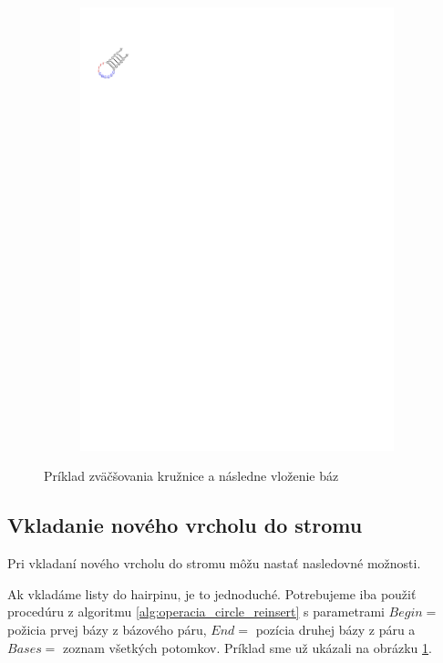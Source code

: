 \begin{figure}
\begin{subfigure}{\wi}
    \includegraphics[trim=1cm 24.5cm 17.5cm 2.5cm]{../img/alg/insert/1/circle-big-end}
  \end{subfigure}

  \caption{Príklad zväčšovania kružnice a následne vloženie báz}
  \label{obr:insert_circle_hairpin}
\end{figure}





\subsection{Vkladanie nového vrcholu do stromu}

Pri vkladaní nového vrcholu do stromu môžu nastať nasledovné možnosti.

Ak vkladáme listy do hairpinu, je to jednoduché. Potrebujeme iba použiť
procedúru z algoritmu \ref{alg:operacia_circle_reinsert}
s parametrami $Begin = $ požicia prvej bázy z bázového páru, $End = $ pozícia
druhej bázy z páru a $Bases = $ zoznam všetkých potomkov.
Príklad sme už ukázali na obrázku \ref{obr:insert_circle_hairpin}.

